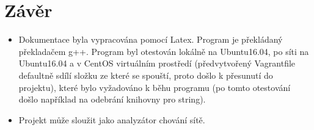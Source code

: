 \documentclass[a4paper,11pt]{article}
\begin{document}
\section*{Závěr}
\begin{itemize}
  \item Dokumentace byla vypracována pomocí Latex. Program je překládaný překladačem g++. Program byl otestován lokálně na Ubuntu16.04, po síti na Ubuntu16.04 a v CentOS virtuálním prostředí (předvytvořený Vagrantfile defaultně sdílí složku ze které se spouští,
  proto došlo k přesunutí do projektu), které bylo vyžadováno k běhu programu (po tomto otestování došlo například na odebrání knihovny pro string).
  \item Projekt může sloužit jako analyzátor chování sítě.
\end{itemize}

\nocite{*}




\newpage
\thispagestyle{empty}
\end{document}

